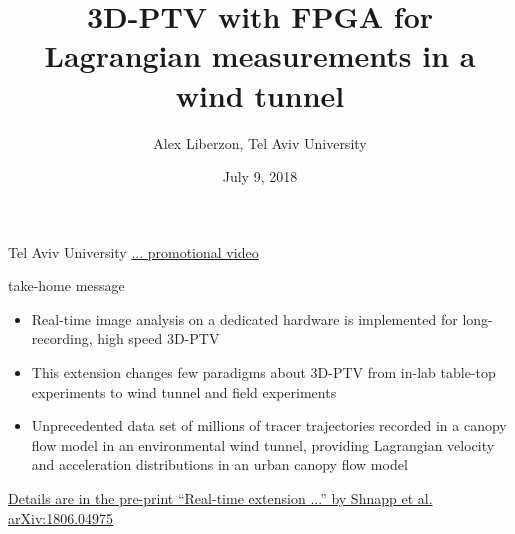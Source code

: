 \documentclass[aspectratio=43]{beamer}
\title{3D-PTV with FPGA for Lagrangian measurements in a wind tunnel}
\date{July 9, 2018}
\author[Liberzon]{Alex Liberzon, Tel Aviv University}
\begin{document}
\begin{frame}
\titlepage
\end{frame}

\begin{frame}{Tel Aviv University \href{http://www.youtube.com/watch?v=rbUevEuYQHg}{ ...  promotional video}}
\begin{multicols}{2}
\centering
{} 
\end{multicols}
\end{frame}
%
\begin{frame}{take-home message}
\begin{itemize}
\item Real-time image analysis on a dedicated hardware is implemented for long-recording, high speed 3D-PTV
\item This extension changes few paradigms about 3D-PTV from in-lab table-top experiments to wind tunnel and field experiments
\item Unprecedented data set of millions of tracer trajectories recorded in a canopy flow model in an environmental wind tunnel, providing Lagrangian velocity and acceleration distributions in an urban canopy flow model
\end{itemize}

\begin{cardTiny}\href{https://arxiv.org/abs/1806.04975}{Details are in the pre-print ``Real-time extension ...'' by Shnapp et al.  arXiv:1806.04975}
\end{cardTiny}

\end{frame}
%
\end{document}
